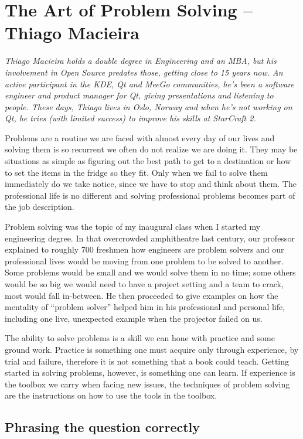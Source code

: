 \chapter{The Art of Problem Solving -- Thiago Macieira}

\textit{Thiago Macieira holds a double degree in Engineering and an MBA, but his involvement in Open Source predates those, getting close to 15 years now. An active participant in the KDE, Qt and MeeGo communities, he's been a software engineer and product manager for Qt, giving presentations and listening to people. These days, Thiago lives in Oslo, Norway and when he's not working on Qt, he tries (with limited success) to improve his skills at StarCraft 2.}

Problems are a routine we are faced with almost every day of our lives and solving them is so recurrent we often do not realize we are doing it. They may be situations as simple as figuring out the best path to get to a destination or how to set the items in the fridge so they fit. Only when we fail to solve them immediately do we take notice, since we have to stop and think about them. The professional life is no different and solving professional problems becomes part of the job description.

Problem solving was the topic of my inaugural class when I started my engineering degree. In that overcrowded amphitheatre last century, our professor explained to roughly 700 freshmen how engineers are problem solvers and our professional lives would be moving from one problem to be solved to another. Some problems would be small and we would solve them in no time; some others would be so big we would need to have a project setting and a team to crack, most would fall in-between. He then proceeded to give examples on how the mentality of ``problem solver'' helped him in his professional and personal life, including one live, unexpected example when the projector failed on us.

The ability to solve problems is a skill we can hone with practice and some ground work. Practice is something one must acquire only through experience, by trial and failure, therefore it is not something that a book could teach. Getting started in solving problems, however, is something one can learn. If experience is the toolbox we carry when facing new issues, the techniques of problem solving are the instructions on how to use the tools in the toolbox.

\section*{Phrasing the question correctly}

